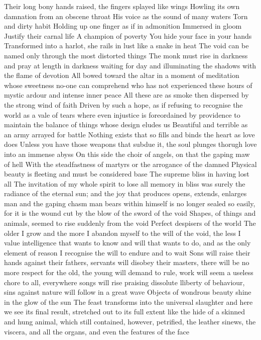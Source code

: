 \documentclass{article}
\begin{document}
\iffalse
Their long bony hands raised, the fingers splayed like wings
Howling its own damnation from an obscene throat
His voice as the sound of many waters
Torn and dirty habit
Holding up one finger as if in admonition
Immersed in gloom
Justify their carnal life
A champion of poverty
You hide your face in your hands
Transformed into a harlot, she rails in lust like a snake in heat
The void can be named only through the most distorted things
The monk must rise in darkness and pray at length in darkness waiting for day and illuminating the shadows with the flame of devotion
All bowed toward the altar in a moment of meditation whose sweetness no-one can comprehend who has not experienced these hours of mystic ardour and intense inner peace
All these are as smoke then dispersed by the strong wind of faith
Driven by such a hope, as if refusing to recognise the world as a vale of tears where even injustice is foreordained by providence to maintain the balance of things whose design eludes us
Beautiful and terrible as an army arrayed for battle
Nothing exists that so fills and binds the heart as love does
Unless you have those weapons that subdue it, the soul plunges thorugh love into an immense abyss
On this side the choir of angels, on that the gaping maw of hell
With the steadfastness of martyrs or the arrogance of the damned
Physical beauty is fleeting and must be considered base
The supreme bliss in having lost all
The invitation of my whole spirit to lose all memory in bliss was surely the radiance of the eternal sun; and the joy that produces opens, extends, enlarges man and the gaping chasm man bears within himself is no longer sealed so easily, for it is the wound cut by the blow of the sword of the void
Shapes, of things and animals, seemed to rise suddenly from the void
Perfect despisers of the world
The older I grow and the more I abandon myself to the will of the void, the less I value intelligence that wants to know and will that wants to do, and as the only element of reason I recognise the will to endure and to wait
Sons will raise their hands against their fathers, servants will disobey their masters, there will be no more respect for the old, the young will demand to rule, work will seem a useless chore to all, everywhere songs will rise praising dissolute lliberty of behaviour, sins against nature will follow in a great wave
Objects of wondrous beauty shine in the glow of the sun
The feast transforms into the universal slaughter and here we see its final result, stretched out to its full extent like the hide of a skinned and hung animal, which still contained, however, petrified, the leather sinews, the viscera, and all the organs, and even the features of the face
\end{document}

